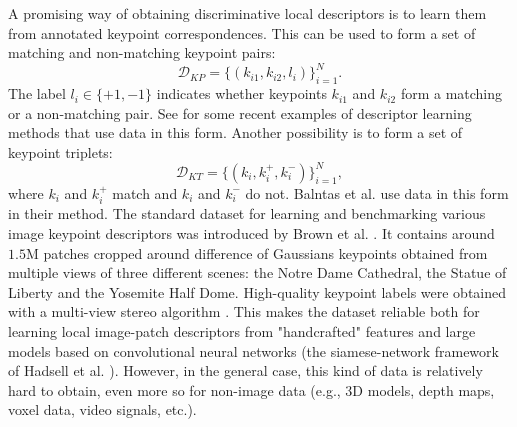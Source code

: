 \documentclass[10pt,conference,a4paper]{IEEEtran}
\begin{document}
		A promising way of obtaining discriminative local descriptors is to learn them from annotated keypoint correspondences.
		This can be used to form a set of matching and non-matching keypoint pairs:
		\begin{equation}\label{eq:kppairs}
			\mathcal{D}_{KP}=
			\{(k_{i1}, k_{i2}, l_i)\}_{i=1}^N
			.
		\end{equation}
		The label $l_i\in\{+1, -1\}$ indicates whether keypoints $k_{i1}$ and $k_{i2}$ form a matching or a non-matching pair.
		See \cite{brown,binboost,rfd,zagoruyko,matchnet,convdesc} for some recent examples of descriptor learning methods that use data in this form.
		Another possibility is to form a set of keypoint triplets:
		\begin{equation}\label{eq:kptriplets}
			\mathcal{D}_{KT}=
			\{(k_i, k_i^+, k_i^-)\}_{i=1}^N
			,
		\end{equation}
		where $k_i$ and $k_i^+$ match and $k_i$ and $k_i^-$ do not.
		Balntas et al. \cite{pnnet} use data in this form in their method.
		The standard dataset for learning and benchmarking various image keypoint descriptors was introduced by Brown et al. \cite{brown}. %
		It contains around $1.5$M patches cropped around difference of Gaussians keypoints \cite{sift} obtained from multiple views of three different scenes: the Notre Dame Cathedral, the Statue of Liberty and the Yosemite Half Dome.
		High-quality keypoint labels were obtained with a multi-view stereo algorithm \cite{multiviewstereo}.
		This makes the dataset reliable both for learning local image-patch descriptors from "handcrafted" features \cite{cvx,binboost,rfd} and large models based on convolutional neural networks \cite{osendorfer,zagoruyko,matchnet,fracking,convdesc,pnnet}
		(the siamese-network framework of Hadsell et al. \cite{siamesenet}).
		However, in the general case, this kind of data is relatively hard to obtain, even more so for non-image data (e.g., 3D models, depth maps, voxel data, video signals, etc.).
\end{document}

